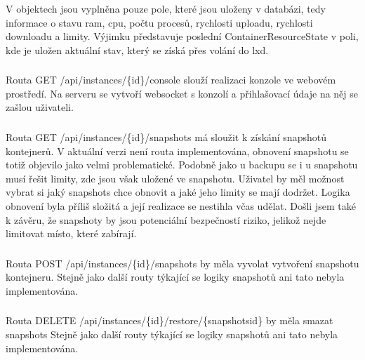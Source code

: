 \documentclass[a4paper,oneside,12pt]{report}
\begin{document}
V objektech jsou vyplněna pouze pole, které jsou uloženy v databázi, tedy informace o stavu ram, cpu, počtu procesů, rychlosti uploadu, rychlosti downloadu a limity.
Výjimku představuje poslední ContainerResourceState v poli, kde je uložen aktuální stav, který se získá přes volání do lxd.

\subsubsection{}

Routa GET /api/instances/\{id\}/console slouží realizaci konzole ve webovém prostředí.
Na serveru se vytvoří websocket s konzolí a přihlašovací údaje na něj se zašlou uživateli.

\subsubsection{}

Routa GET /api/instances/\{id\}/snapshots má sloužit k získání snapshotů kontejnerů.
V aktuální verzi není routa implementována, obnovení snapshotu se totiž objevilo jako velmi problematické.
Podobně jako u backupu se i u snapshotu musí řešit limity, zde jsou však uložené ve snapshotu.
Uživatel by měl možnost vybrat si jaký snapshots chce obnovit a jaké jeho limity se mají dodržet.
Logika obnovení byla příliš složitá a její realizace se nestihla včas udělat.
Došli jsem také k závěru, že snapshoty by jsou potenciální bezpečností riziko, jelikož nejde limitovat místo, které zabírají.


\subsubsection{}

Routa POST /api/instances/\{id\}/snapshots by měla vyvolat vytvoření snapshotu kontejneru.
Stejně jako další routy týkající se logiky snapshotů ani tato nebyla implementována.

\subsubsection{}

Routa DELETE /api/instances/\{id\}/restore/\{snapshotsid\} by měla smazat snapshots
Stejně jako další routy týkající se logiky snapshotů ani tato nebyla implementována.
\end{document}
